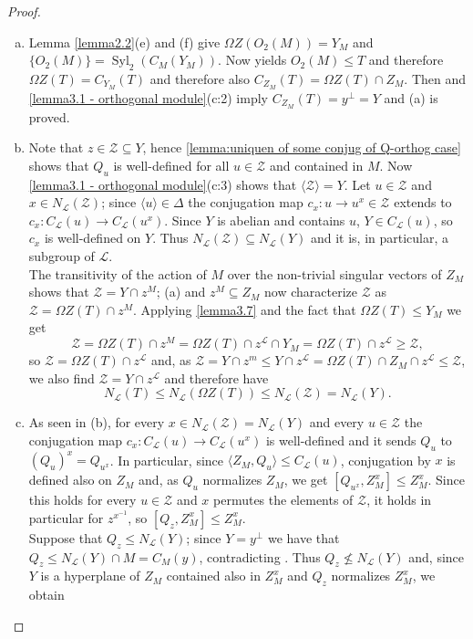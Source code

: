 \documentclass{amsart}
\numberwithin{equation}{section}
\theoremstyle{definition}
\theoremstyle{subresult}
\theoremstyle{caseresult}
\renewcommand{\L}{\mathcal{L}}
\newcommand{\Z}{\mathcal{Z}}
\newcommand{\Syl}{\operatorname{Syl}}
\newcommand{\inv}{^{-1}}
\newcommand{\fto}{\longrightarrow}
\newcommand{\<}{\langle}
\renewcommand{\>}{\rangle}
\begin{document}
\begin{proof}
	\begin{enumerate}[(a)]
		\item Lemma \ref{lemma2.2}(e) and (f) give $\Omega Z(O_2(M)) =Y_M$ and $\{O_2(M)\} = \Syl_2(C_M(Y_M))$. Now \cite[Lemma 3.4(c)]{Meier-Stell-Stroth:2012} yields $O_2(M) \le T$ and therefore $\Omega Z(T) =C_{Y_M}(T)$ and therefore also $C_{Z_M}(T) = \Omega Z(T) \cap Z_M$. Then \cite[Lemma 3.3(b)]{Meier-Stell-Stroth:2012} and \ref{lemma3.1 - orthogonal module}(c:2) imply $C_{Z_M}(T) = y^\perp =Y$ and (a) is proved.
		\item Note that $z \in \mathcal{Z} \subseteq Y$, hence \ref{lemma:uniquen of some conjug of Q-orthog case} shows that $Q_u$ is well-defined for all $u \in \mathcal{Z}$ and contained in $M$. Now \ref{lemma3.1 - orthogonal module}(c:3) shows that $\< \mathcal{Z} \> = Y$. Let $u \in \mathcal{Z}$ and $x \in N_\L(\mathcal{Z})$; since $\<u\> \in \Delta$ the conjugation map $c_x: u \fto u^x \in \mathcal{Z}$ extends to $c_x: C_\L(u) \fto C_\L(u^x)$. Since $Y$ is abelian and contains $u$, $Y \in C_\L(u)$, so $c_x$ is well-defined on $Y$. Thus $N_\L(\mathcal{Z}) \subseteq N_\L(Y)$ and it is, in particular, a subgroup of $\L$.\\
		The transitivity of the action of $M$ over the non-trivial singular vectors of $Z_M$ shows that $\mathcal{Z}=Y \cap z^M$; (a) and $z^M \subseteq Z_M$ now characterize $\mathcal{Z}$ as $\mathcal{Z} = \Omega Z(T) \cap z^M$. Applying \ref{lemma3.7} and the fact that $\Omega Z(T) \le Y_M$ we get 
		\[
		\mathcal{Z} = \Omega Z(T) \cap z^M = \Omega Z(T) \cap z^\L \cap Y_M = \Omega Z(T) \cap z^\L \ge \mathcal{Z},
		\]
		so $\mathcal{Z} = \Omega Z(T) \cap z^\L$ and, as $\mathcal{Z} = Y \cap z^m \le Y \cap z^\L = \Omega Z(T) \cap Z_M \cap z^\L \le \mathcal{Z}$, we also find $\mathcal{Z}= Y \cap z^\L$ and therefore have
		\[
		N_\L(T) \le N_\L(\Omega Z(T)) \le N_\L(\mathcal{Z}) = N_\L(Y).
		\]
		\item As seen in (b), for every $x \in N_\L(\mathcal{Z})=N_\L(Y)$ and every $u \in \Z$ the conjugation map $c_x: C_\L(u) \fto C_\L(u^x)$ is well-defined and it sends $Q_u$ to $(Q_u)^x = Q_{u^x}$. In particular, since $\<Z_M,Q_u\> \le C_\L(u)$, conjugation by $x$ is defined also on $Z_M$ and, as $Q_u$ normalizes $Z_M$, we get $[Q_{u^x},Z_M^x] \le Z_M^x$. Since this holds for every $u \in \mathcal{Z}$ and $x$ permutes the elements of $\mathcal{Z}$, it holds in particular for $z^{x\inv}$, so $[Q_z,Z_M^x] \le Z_M^x$.\\
		Suppose that $Q_z \le N_\L(Y)$; since $Y=y^\perp$ we have that $Q_z \le N_\L(Y) \cap M =C_M(y)$, contradicting \cite[Lemma 3.4(a)]{Meier-Stell-Stroth:2012}. Thus $Q_z \not \le N_\L(Y)$ and, since $Y$ is a hyperplane of $Z_M$ contained also in $Z_M^x$ and $Q_z$ normalizes $Z_M^x$, we obtain

\end{enumerate}
\end{proof}
\end{document}

